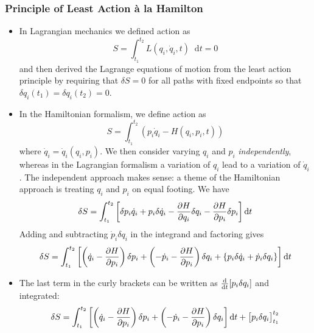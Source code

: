 \documentclass[11pt, a4paper]{article}
\newcommand{\diff}{\mathop{}\!\mathrm{d}} %
\begin{document}
\subsubsection{Principle of Least Action \`{a} la Hamilton}
\begin{itemize}
	\item In Lagrangian mechanics we defined action as 
	\begin{equation*}
		S = \int_{t_{1}}^{t_{2}} L(q_{i}, \dot{q}_{i}, t) \diff t = 0
	\end{equation*}
	and then derived the Lagrange equations of motion from the least action principle by requiring that $ \delta S = 0 $ for all paths with fixed endpoints so that $ \delta q_{i}(t_{1}) = \delta q_{i}(t_{2}) = 0 $.
	
	\item In the Hamiltonian formalism, we define action as
	\begin{equation*}
		S = \int_{t_{1}}^{t_{2}}(p_{i}\dot{q}_{i} - H(q_{i}, p_{i}, t))
	\end{equation*}
	where $ \dot{q}_{i} = \dot{q}_{i}(q_{i}, p_{i}) $.	We then consider varying $ q_{i} $ and $ p_{i} $ \textit{independently}, whereas in the Lagrangian formalism a variation of $ q_{i} $ lead to a variation of $ \dot{q}_{i} $. The independent approach makes sense: a theme of the Hamiltonian approach is treating $ q_{i} $ and $ p_{i} $ on equal footing. We have
	\begin{equation*}
		\delta S = \int_{t_{1}}^{t_{2}} \left[\delta p_{i} \dot{q}_{i} + p_{i} \delta \dot{q}_{i} - \pdv{H}{q_{i}}\delta q_{i} - \pdv{H}{p_{i}}\delta p_{i}\right] \diff t
	\end{equation*}
	Adding and subtracting $ \dot{p}_{i}\delta q_{i} $ in the integrand and factoring gives
	\begin{equation*}
			\delta S = \int_{t_{1}}^{t_{2}} \left[\left(\dot{q}_{i} - \pdv{H}{p_{i}}\right)\delta p_{i} + \left(-\dot{p}_{i} - \pdv{H}{p_{i}}\right)\delta q_{i} +  \{ p_{i}\delta \dot{q}_{i} + \dot{p}_{i} \delta q_{i}  \} \right] \diff t
	\end{equation*}
	
	\item The last term in the curly brackets can be written as $ \dv{}{t}[p_{i}\delta q_{i}] $ and integrated:
	\begin{equation*}
		\delta S = \int_{t_{1}}^{t_{2}} \left[\left(\dot{q}_{i} - \pdv{H}{p_{i}}\right)\delta p_{i} + \left(-\dot{p}_{i} - \pdv{H}{p_{i}}\right)\delta q_{i} \right] \diff t + \big[p_{i}\delta q_{i} \big]_{t_{1}}^{t_{2}}
	\end{equation*}
	

\end{itemize}
\end{document}
